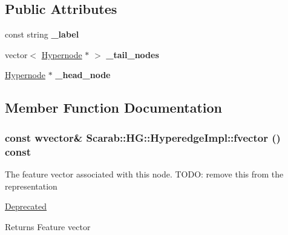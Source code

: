 \subsection*{Public Attributes}
\begin{DoxyCompactItemize}
\item 
\hypertarget{classScarab_1_1HG_1_1HyperedgeImpl_ab14180934c56806b0004bcbdac9eef88}{
const string {\bfseries \_\-label}}
\label{classScarab_1_1HG_1_1HyperedgeImpl_ab14180934c56806b0004bcbdac9eef88}

\item 
\hypertarget{classScarab_1_1HG_1_1HyperedgeImpl_a70fab435c66aab79825aab6b9058cda5}{
vector$<$ \hyperlink{classScarab_1_1HG_1_1Hypernode}{Hypernode} $\ast$ $>$ {\bfseries \_\-tail\_\-nodes}}
\label{classScarab_1_1HG_1_1HyperedgeImpl_a70fab435c66aab79825aab6b9058cda5}

\item 
\hypertarget{classScarab_1_1HG_1_1HyperedgeImpl_a92aeb9593a64be769f18666c3bfd0a20}{
\hyperlink{classScarab_1_1HG_1_1Hypernode}{Hypernode} $\ast$ {\bfseries \_\-head\_\-node}}
\label{classScarab_1_1HG_1_1HyperedgeImpl_a92aeb9593a64be769f18666c3bfd0a20}

\end{DoxyCompactItemize}


\subsection{Member Function Documentation}
\hypertarget{classScarab_1_1HG_1_1HyperedgeImpl_a359446c285164a93995bb87e6ea74882}{
\subsubsection[{fvector}]{\setlength{\rightskip}{0pt plus 5cm}const {\bf wvector}\& Scarab::HG::HyperedgeImpl::fvector () const}}
\label{classScarab_1_1HG_1_1HyperedgeImpl_a359446c285164a93995bb87e6ea74882}
The feature vector associated with this node. TODO: remove this from the representation \begin{Desc}
\item[\hyperlink{deprecated__deprecated000005}{Deprecated}]\end{Desc}
\begin{DoxyReturn}{Returns}
Feature vector 
\end{DoxyReturn}


